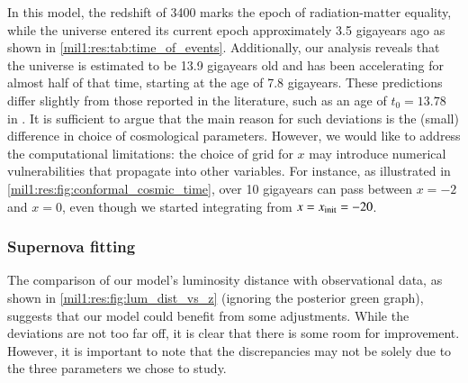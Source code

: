 
In this model, the redshift of 3400 marks the epoch of radiation-matter equality, while the universe entered its current epoch approximately 3.5 gigayears ago as shown in \cref{mil1:res:tab:time_of_events}. Additionally, our analysis reveals that the universe is estimated to be 13.9 gigayears old and has been accelerating for almost half of that time, starting at the age of 7.8 gigayears. These predictions differ slightly from those reported in the literature, such as an age of $t_0=13.78$ in \citep{DodelsonBook}. It is sufficient to argue that the main reason for such deviations is the (small) difference in choice of cosmological parameters. However, we would like to address the computational limitations: the choice of grid for $x$ may introduce numerical vulnerabilities that propagate into other variables. For instance, as illustrated in \cref{mil1:res:fig:conformal_cosmic_time}, over 10 gigayears can pass between $x=-2$ and $x=0$, even though we started integrating from $x=x_\mathrm{init}=-20$.  







\subsubsection{Supernova fitting}
    The comparison of our model's luminosity distance with observational data, as shown in \cref{mil1:res:fig:lum_dist_vs_z} (ignoring the posterior green graph), suggests that our model could benefit from some adjustments. While the deviations are not too far off, it is clear that there is some room for improvement. However, it is important to note that the discrepancies may not be solely due to the three parameters we chose to study. 

